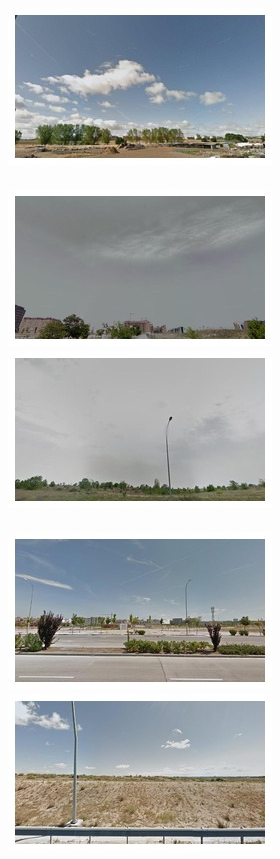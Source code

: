 \begin{figure}
\begin{minipage}{\linewidth}
\begin{minipage}{0.3\linewidth}
      \includegraphics[width=0.49\linewidth]{imgs/view/mosaicsV1/mosaic0005.jpg}
      \\ \vspace{-3mm} \\
      \includegraphics[width=0.49\linewidth]{imgs/view/mosaicsV1/mosaic0006.jpg}
      \includegraphics[width=0.49\linewidth]{imgs/view/mosaicsV1/mosaic0007.jpg}
      \\ \vspace{-3mm} \\
      \includegraphics[width=0.49\linewidth]{imgs/view/mosaicsV1/mosaic0008.jpg}
      \includegraphics[width=0.49\linewidth]{imgs/view/mosaicsV1/mosaic0009.jpg}

\end{minipage}
\end{minipage}
\end{figure}
